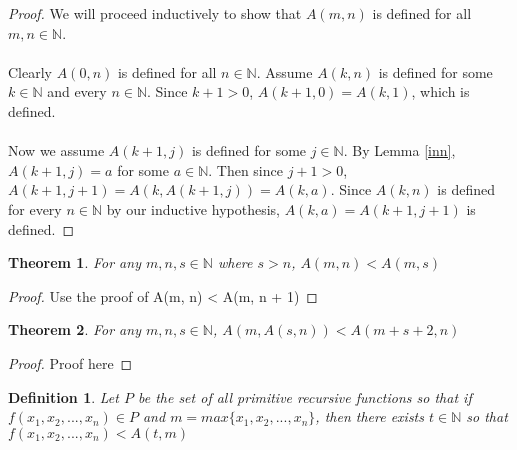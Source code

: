 \documentclass[12pt, letterpaper]{article}
\newtheorem{theorem}{Theorem}
\newtheorem*{definition}{Definition}
\begin{document}
    \begin{proof}
      We will proceed inductively to show that $A(m, n)$ is defined for all $m, n \in \mathbb{N}$.
      \\ 
      \\
      Clearly $A(0, n)$ is defined for all $n \in \mathbb{N}$.
      Assume $A(k, n)$ is defined for some $k \in \mathbb{N}$ and every $n \in \mathbb{N}$.
      Since $k + 1 > 0$, $A(k + 1, 0) = A(k, 1)$, which is defined.
      \\
      \\
      Now we assume $A(k + 1, j)$ is defined for some $j \in \mathbb{N}$.
      By Lemma \ref{inn}, $A(k + 1, j) = a$ for some $a \in \mathbb{N}$.
      Then since $j + 1 > 0$, $A(k + 1, j + 1) = A(k, A(k + 1, j)) = A(k, a)$.
      Since $A(k, n)$ is defined for every $n \in \mathbb{N}$ by our inductive hypothesis,
      $A(k, a) = A(k + 1, j + 1)$ is defined.
    \end{proof}

    \begin{theorem}
      \label{lt}
      For any $m, n, s \in \mathbb{N}$ where $s > n$, $A(m, n) < A(m, s)$
    \end{theorem}
    \begin{proof}
      Use the proof of A(m, n) < A(m, n + 1)
    \end{proof}

    \begin{theorem}
      \label{plus2}
      For any $m, n, s \in \mathbb{N}$, $A(m, A(s, n)) < A(m + s + 2, n)$
    \end{theorem}
    \begin{proof}
      Proof here
    \end{proof}
    
    \begin{definition}
      Let $P$ be the set of all primitive recursive functions so that if $f(x_1, x_2, ..., x_n) \in P$ and
      $m = max\{x_1, x_2, ..., x_n\}$, then there exists $t \in \mathbb{N}$ so that 
      $f(x_1, x_2, ..., x_n) < A(t, m)$
    \end{definition}
\end{document}
